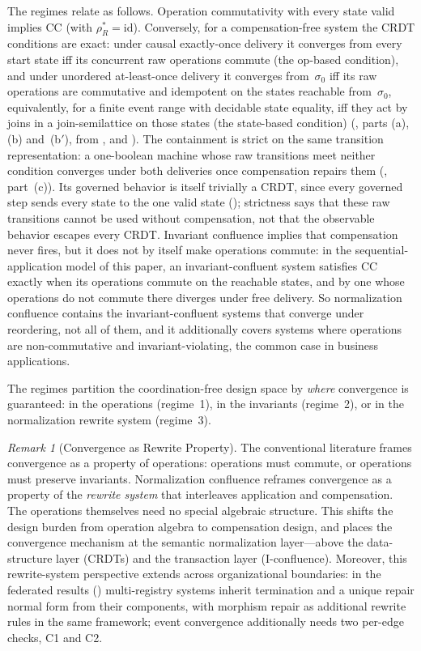 \documentclass[11pt,a4paper]{article}
\theoremstyle{plain}
\theoremstyle{definition}
\theoremstyle{remark}
\newtheorem{remark}[theorem]{Remark}
\renewcommand{\_}{\textunderscore\allowbreak}
\begin{document}
The regimes relate as follows.  Operation commutativity with every state
valid implies CC (with $\rho_R^* = \mathrm{id}$).  Conversely, for a
compensation-free system the CRDT conditions are exact: under causal
exactly-once delivery it converges from every start state iff its concurrent
raw operations commute (the op-based condition), and under unordered
at-least-once delivery it converges from~$\sigma_0$ iff its raw operations are
commutative and idempotent on the states reachable from~$\sigma_0$,
equivalently, for a finite event range with decidable state equality, iff
they act by joins in a join-semilattice on those states (the state-based
condition) (, parts (a), (b) and~(b$'$), from
,  and
).  The containment is strict on the same transition
representation: a one-boolean machine whose raw transitions meet neither
condition converges under both deliveries once compensation repairs them
(, part~(c)).  Its governed behavior is itself trivially a
CRDT, since every governed step sends every state to the one valid state
(); strictness says that these raw transitions
cannot be used without compensation, not that the observable behavior escapes
every CRDT.  Invariant confluence implies that compensation never fires,
but it does not by itself make operations commute: in the
sequential-application model of this paper, an invariant-confluent system
satisfies CC exactly when its operations commute on the reachable states, and
by  one whose operations do not commute there diverges
under free delivery.  So normalization confluence contains the
invariant-confluent systems that converge under reordering, not all of them,
and it additionally covers systems where operations are non-commutative and
invariant-violating, the common case in business applications.

The regimes partition the coordination-free design space by \emph{where}
convergence is guaranteed: in the operations (regime~1), in the invariants
(regime~2), or in the normalization rewrite system (regime~3).

\begin{remark}[Convergence as Rewrite Property]
\label{rem:rewrite-property}
The conventional literature frames convergence as a property of operations:
operations must commute, or operations must preserve invariants.
Normalization confluence reframes convergence as a property of the
\emph{rewrite system} that interleaves application and compensation.  The
operations themselves need no special algebraic structure.  This shifts the
design burden from operation algebra to compensation design, and places the
convergence mechanism at the semantic normalization layer---above the
data-structure layer (CRDTs) and the transaction layer (I-confluence).
Moreover, this rewrite-system perspective extends across organizational
boundaries: in the federated results () multi-registry
systems inherit termination and a unique repair normal form from their
components, with morphism repair as additional rewrite rules in the same
framework; event convergence additionally needs two per-edge checks, C1 and C2.
\end{remark}
\end{document}
